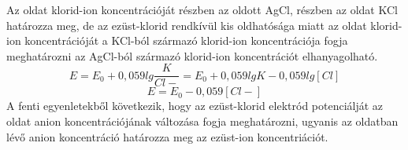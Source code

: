 \begin{enumerate}
Az oldat klorid-ion koncentrációját részben az oldott AgCl, részben az oldat KCl határozza meg, de az ezüst-klorid rendkívül kis oldhatósága miatt az oldat klorid-ion koncentrációját a KCl-ból származó klorid-ion koncentrációja fogja meghatározni az AgCl-ból származó klorid-ion koncentrációt elhanyagolható.\\
\begin{equation}
E = E_\text{0} + 0,059 lg \frac{K}{Cl-} = E_\text{0} + 0,059 lg K - 0,059 lg [Cl]
\end{equation}
\begin{equation}
E = E_\text{0} - 0,059 [Cl-]
\end{equation}
A fenti egyenletekből következik, hogy az ezüst-klorid elektród potenciálját az oldat anion koncentrációjának változása fogja meghatározni, ugyanis az oldatban lévő anion koncentráció határozza meg az ezüst-ion koncentriációt.

\end{enumerate}


    
    



